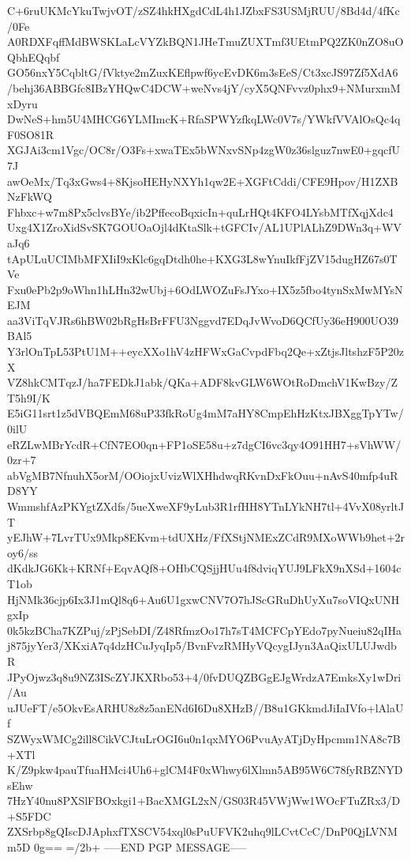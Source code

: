 C+6ruUKMcYkuTwjvOT/zSZ4hkHXgdCdL4h1JZbxFS3USMjRUU/8Bd4d/4fKc/0Fe
A0RDXFqffMdBWSKLaLcVYZkBQN1JHeTmuZUXTmf3UEtmPQ2ZK0nZO8uOQbhEQqbf
GO56nxY5CqbltG/fVktye2mZuxKEflpwf6ycEvDK6m3sEeS/Ct3xcJS97Zf5XdA6
/behj36ABBGfc8IBzYHQwC4DCW+weNvs4jY/cyX5QNFvvz0phx9+NMurxmMxDyru
DwNeS+hm5U4MHCG6YLMImcK+RfaSPWYzfkqLWc0V7s/YWkfVVAlOsQc4qF0SO81R
XGJAi3cm1Vgc/OC8r/O3Fs+xwaTEx5bWNxvSNp4zgW0z36slguz7nwE0+gqcfU7J
awOeMx/Tq3xGws4+8KjsoHEHyNXYh1qw2E+XGFtCddi/CFE9Hpov/H1ZXBNzFkWQ
Fhbxc+w7m8Px5clvsBYe/ib2PffecoBqxicIn+quLrHQt4KFO4LYsbMTfXqjXdc4
Uxg4X1ZroXidSvSK7GOUOaOjl4dKtaSlk+tGFCIv/AL1UPlALhZ9DWn3q+WVaJq6
tApULuUCIMbMFXIiI9xKlc6gqDtdh0he+KXG3L8wYnuIkfFjZV15dugHZ67s0TVe
Fxu0ePb2p9oWhn1hLHn32wUbj+6OdLWOZuFsJYxo+IX5z5fbo4tynSxMwMYsNEJM
aa3ViTqVJRs6hBW02bRgHsBrFFU3Nggvd7EDqJvWvoD6QCfUy36eH900UO39BAl5
Y3rlOnTpL53PtU1M++eycXXo1hV4zHFWxGaCvpdFbq2Qe+xZtjsJltshzF5P20zX
VZ8hkCMTqzJ/ha7FEDkJ1abk/QKa+ADF8kvGLW6WOtRoDmchV1KwBzy/ZT5h9I/K
E5iG11srt1z5dVBQEmM68uP33fkRoUg4mM7aHY8CmpEhHzKtxJBXggTpYTw/0ilU
eRZLwMBrYcdR+CfN7EO0qn+FP1oSE58u+z7dgCI6vc3qy4O91HH7+sVhWW/0zr+7
abVgMB7NfnuhX5orM/OOiojxUvizWlXHhdwqRKvnDxFkOuu+nAvS40mfp4uRD8YY
WmmshfAzPKYgtZXdfs/5ueXweXF9yLub3R1rfHH8YTnLYkNH7tl+4VvX08yrltJT
yEJhW+7LvrTUx9Mkp8EKvm+tdUXHz/FfXStjNMExZCdR9MXoWWb9het+2roy6/ss
dKdkJG6Kk+KRNf+EqvAQf8+OHbCQSjjHUu4f8dviqYUJ9LFkX9nXSd+1604cT1ob
HjNMk36cjp6Ix3J1mQl8q6+Au6U1gxwCNV7O7hJScGRuDhUyXu7soVIQxUNHgxIp
0k5kzBCha7KZPuj/zPjSebDI/Z48RfmzOo17h7sT4MCFCpYEdo7pyNueiu82qIHa
j875jyYer3/XKxiA7q4dzHCuJyqIp5/BvnFvzRMHyVQcygIJyn3AaQixULUJwdbR
JPyOjwz3q8u9NZ3IScZYJKXRbo53+4/0fvDUQZBGgEJgWrdzA7EmksXy1wDri/Au
uJUeFT/e5OkvEsARHU8z8z5anENd6I6Du8XHzB//B8u1GKkmdJiIaIVfo+lAlaUf
SZWyxWMCg2ill8CikVCJtuLrOGI6u0n1qxMYO6PvuAyATjDyHpcmm1NA8c7B+XTl
K/Z9pkw4pauTfuaHMci4Uh6+glCM4F0xWhwy6lXlmn5AB95W6C78fyRBZNYDsEhw
7HzY40nu8PXSlFBOxkgi1+BacXMGL2xN/GS03R45VWjWw1WOcFTuZRx3/D+S5FDC
ZXSrbp8gQIscDJAphxfTXSCV54xql0sPuUFVK2uhq9lLCvtCcC/DnP0QjLVNMm5D
0g==
=/2b+
-----END PGP MESSAGE-----
